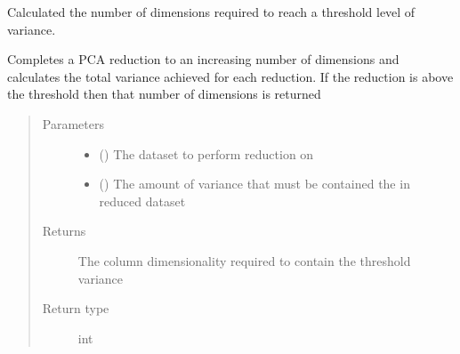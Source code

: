 \documentclass[letterpaper,10pt,english]{sphinxmanual}
\begin{document}
\begin{fulllineitems}
\label{\detokenize{index:Forecaster.preprocessing.dimension_selector}}
Calculated the number of dimensions required to reach a threshold level
of variance.

Completes a PCA reduction to an increasing number of dimensions
and calculates the total variance achieved for each reduction. If the
reduction is above the threshold then that number of dimensions is returned
\begin{quote}\begin{description}
\item[{Parameters}] \leavevmode\begin{itemize}
\item {} 
 () \textendash{} The dataset to perform reduction on

\item {} 
 () \textendash{} The amount of variance that must be
contained the in reduced dataset

\end{itemize}

\item[{Returns}] \leavevmode
The column dimensionality required to
contain the threshold variance

\item[{Return type}] \leavevmode
int

\end{description}\end{quote}

\end{fulllineitems}

\end{document}
